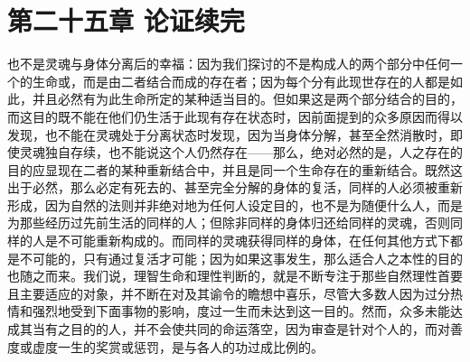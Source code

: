 
\section{第二十五章 论证续完}

也不是灵魂与身体分离后的幸福：因为我们探讨的不是构成人的两个部分中任何一个的生命或，而是由二者结合而成的存在者；因为每个分有此现世存在的人都是如此，并且必然有为此生命所定的某种适当目的。但如果这是两个部分结合的目的，而这目的既不能在他们仍生活于此现有存在状态时，因前面提到的众多原因而得以发现，也不能在灵魂处于分离状态时发现，因为当身体分解，甚至全然消散时，即使灵魂独自存续，也不能说这个人仍然存在——那么，绝对必然的是，人之存在的目的应显现在二者的某种重新结合中，并且是同一个生命存在的重新结合。既然这出于必然，那么必定有死去的、甚至完全分解的身体的复活，同样的人必须被重新形成，因为自然的法则并非绝对地为任何人设定目的，也不是为随便什么人，而是为那些经历过先前生活的同样的人；但除非同样的身体归还给同样的灵魂，否则同样的人是不可能重新构成的。而同样的灵魂获得同样的身体，在任何其他方式下都是不可能的，只有通过复活才可能；因为如果这事发生，那么适合人之本性的目的也随之而来。我们说，理智生命和理性判断的，就是不断专注于那些自然理性首要且主要适应的对象，并不断在对及其谕令的瞻想中喜乐，尽管大多数人因为过分热情和强烈地受到下面事物的影响，度过一生而未达到这一目的。然而，众多未能达成其当有之目的的人，并不会使共同的命运落空，因为审查是针对个人的，而对善度或虚度一生的奖赏或惩罚，是与各人的功过成比例的。\par

